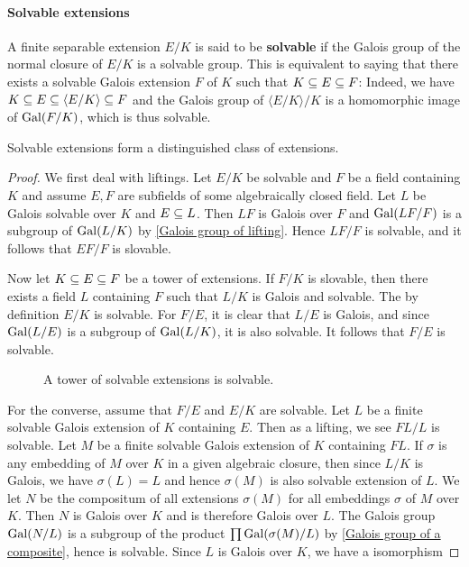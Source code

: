 \paragraph{Solvable extensions}
A finite separable extension $E/K$ is said to be \textbf{solvable} if the Galois group of the normal closure of $E/K$ is a solvable group. This is equivalent to saying that there exists a solvable Galois extension $F$ of $K$ such that $K\subseteq E\subseteq F$: Indeed, we have $K\subseteq E\subseteq \langle E/K\rangle\subseteq F$ and the Galois group of $\langle E/K\rangle/K$ is a homomorphic image of $\mathrm{Gal}(F/K)$, which is thus solvable.
\begin{proposition}\label{field ext solvable distinguished}
Solvable extensions form a distinguished class of extensions.
\end{proposition}
\begin{proof}
We first deal with liftings. Let $E/K$ be solvable and $F$ be a field containing $K$ and assume $E,F$ are subfields of some algebraically closed field. Let $L$ be Galois solvable over $K$ and $E\subseteq L$. Then $LF$ is Galois over $F$ and $\mathrm{Gal}(LF/F)$ is a subgroup of $\mathrm{Gal}(L/K)$ by \cref{Galois group of lifting}. Hence $LF/F$ is solvable, and it follows that $EF/F$ is slovable.\par
Now let $K\subseteq E\subseteq F$ be a tower of extensions. If $F/K$ is slovable, then there exists a field $L$ containing $F$ such that $L/K$ is Galois and solvable. The by definition $E/K$ is solvable. For $F/E$, it is clear that $L/E$ is Galois, and since $\mathrm{Gal}(L/E)$ is a subgroup of $\mathrm{Gal}(L/K)$, it is also solvable. It follows that $F/E$ is solvable.\par
\vspace{-3pt}
\begin{figure}[htbp]
\centering
{}
\caption{A tower of solvable extensions is solvable.}
\end{figure}
\vspace{-3pt}
For the converse, assume that $F/E$ and $E/K$ are solvable. Let $L$ be a finite solvable Galois extension of $K$ containing $E$. Then as a lifting, we see $FL/L$ is solvable. Let $M$ be a finite solvable Galois extension of $K$ containing $FL$. If $\sigma$ is any embedding of $M$ over $K$ in a given algebraic closure, then since $L/K$ is Galois, we have $\sigma(L)=L$ and hence $\sigma(M)$ is also solvable extension of $L$. We let $N$ be the compositum of all extensions $\sigma(M)$ for all embeddings $\sigma$ of $M$ over $K$. Then $N$ is Galois over $K$ and is therefore Galois over $L$. The Galois group $\mathrm{Gal}(N/L)$ is a subgroup of the product $\prod\mathrm{Gal}(\sigma(M)/L)$ by \cref{Galois group of a composite}, hence is solvable. Since $L$ is Galois over $K$, we have a isomorphism

\end{proof}
